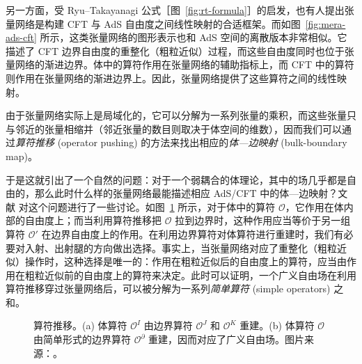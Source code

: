 另一方面，受 Ryu--Takayanagi 公式\cite{ryu2006holographic,nishioka2009holographic}［图~\ref{fig:rt-formula}］的启发，也有人提出张量网络是构建 CFT 与 AdS 自由度之间线性映射的合适框架\cite{swingle2012entanglement}。而如图~\ref{fig:mera-ads-cft} 所示，这类张量网络的图形表示也和 AdS 空间的离散版本非常相似。它描述了 CFT 边界自由度的重整化（粗粒近似）过程，而这些自由度同时也位于张量网络的渐进边界。体中的算符作用在张量网络的辅助指标上，而 CFT 中的算符则作用在张量网络的渐进边界上。因此，张量网络提供了这些算符之间的线性映射\cite{pastawski2015holographic,hayden2016holographic}。

由于张量网络实际上是局域化的，它可以分解为一系列张量的乘积，而这些张量只与邻近的张量相缩并（邻近张量的数目则取决于体空间的维数），因而我们可以通过\emph{算符推移} (operator pushing) 的方法来找出相应的\emph{体—边映射} (bulk-boundary map)\cite{pastawski2015holographic,bhattacharyya2016exploring,bhattacharyya2018tensor}。

于是这就引出了一个自然的问题：对于一个弱耦合的体理论，其中的场几乎都是自由的，那么此时什么样的张量网络最能描述相应 AdS/CFT 中的体—边映射？文献 \parencite{bhattacharyya2018tensor} 对这个问题进行了一些讨论。如图~\ref{fig:operator-pushing} 所示，对于体中的算符 $\mathcal{O}$，它作用在体内部的自由度上；而当利用算符推移把 $\mathcal{O}$ 拉到边界时，这种作用应当等价于另一组算符 $\mathcal{O}'$ 在边界自由度上的作用。在利用边界算符对体算符进行重建时，我们有必要对入射、出射腿的方向做出选择。事实上，当张量网络对应了重整化（粗粒近似）操作时，这种选择是唯一的：作用在粗粒近似后的自由度上的算符，应当由作用在粗粒近似前的自由度上的算符来决定。此时可以证明，一个广义自由场在利用算符推移穿过张量网络后，可以被分解为一系列\emph{简单算符} (simple operators) 之和\cite{bhattacharyya2018tensor}。

\begin{figure}[htb]
  \centering
   \quad
  \caption[算符推移]{算符推移。(a) 体算符 $\mathcal{O}^I$ 由边界算符 $\mathcal{O}^J$ 和 $\mathcal{O}^K$ 重建。(b) 体算符 $\mathcal{O}$ 由简单形式的边界算符 $\mathcal{O}^\partial$ 重建，因而对应了广义自由场。图片来源：\parencite{bhattacharyya2018tensor}。}
  \label{fig:operator-pushing}
\end{figure}

